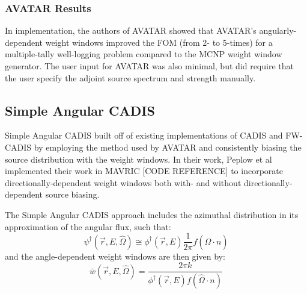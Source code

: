 \subsubsection{AVATAR Results}

In implementation, the authors of AVATAR showed that AVATAR's angularly-dependent
weight windows improved the FOM (from 2- to 5-times) for a multiple-tally well-logging
problem compared to the MCNP weight window generator. The user input for AVATAR was
also minimal, but did require that the user specify the adjoint source spectrum and
strength manually.
%
%

\subsection{Simple Angular CADIS}

Simple Angular CADIS \cite{peplow_consistent_2012} built off of existing
implementations
of CADIS and FW-CADIS by employing the method used by AVATAR and consistently
biasing the
source distribution with the weight windows. In their work, Peplow et al
implemented their
work in MAVRIC [CODE REFERENCE] to incorporate directionally-dependent weight
windows
both with- and without directionally-dependent source biasing.

The Simple Angular CADIS approach includes the azimuthal distribution in its
approximation
of the angular flux, such that:
\begin{equation}
\psi^{\dagger}(\vec{r}, E, \hat \Omega) \cong \phi^{\dagger}(\vec{r}, E)
\frac{1}{2\pi} f(\hat\Omega \cdot n)
\end{equation}
and the angle-dependent weight windows are then given by:
\begin{equation}
\bar {w} (\vec{r},E,\hat\Omega) = \frac{2 \pi k}{\phi^{\dagger}(\vec{r},E)
                                  f(\hat\Omega \cdot n)}
\end{equation}

